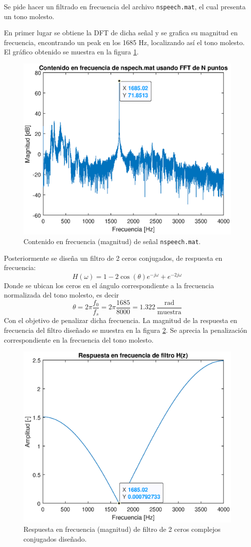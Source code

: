 Se pide hacer un filtrado en frecuencia del archivo \texttt{nspeech.mat}, el cual presenta un tono molesto.

En primer lugar se obtiene la DFT de dicha señal y se grafica su magnitud en frecuencia, encontrando un peak en los 1685 Hz, localizando así el tono molesto. El gráfico obtenido se muestra en la figura \ref{fig:p3_1cf}.

\begin{figure}[H]
    \centering
    \includegraphics[width = .8\linewidth]{Figuras/p3_1cf.eps}
    \caption{Contenido en frecuencia (magnitud) de señal \texttt{nspeech.mat}.}
    \label{fig:p3_1cf}
\end{figure}

Posteriormente se diseña un filtro de 2 ceros conjugados, de respuesta en frecuencia:
$$ H(\omega) = 1-2\cos{(\theta)e^{-j\omega}+e^{-2j\omega}}$$
Donde se ubican los ceros en el ángulo correspondiente a la frecuencia normalizada del tono molesto, es decir 
$$ \theta = 2\pi \dfrac{f_0}{f_s} =2\pi \dfrac{1685}{8000} = 1.322~ \dfrac{\text{rad}}{\text{muestra}}$$
Con el objetivo de penalizar dicha frecuencia. La magnitud de la respuesta en frecuencia del filtro diseñado se muestra en la figura \ref{fig:p3_2rfH}. Se aprecia la penalización correspondiente en la frecuencia del tono molesto. 

\begin{figure}[H]
    \centering
    \includegraphics[width = .8\linewidth]{Figuras/p3_2rfH.eps}
    \caption{Respuesta en frecuencia (magnitud) de filtro de 2 ceros complejos conjugados diseñado.}
    \label{fig:p3_2rfH}
\end{figure}

